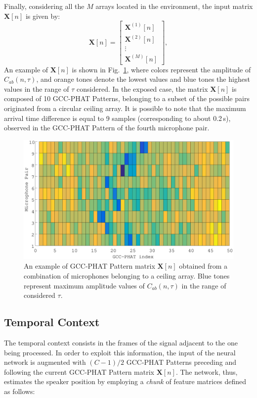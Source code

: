 \documentclass[review]{elsarticle}
\newcommand{\figref}[1]{Fig.~\ref{#1}}
\begin{document}
Finally, considering all the $M$ arrays located in the environment, the input matrix $\mathbf{X}[n]$ is given by:
\begin{equation}\label{eq:fx_matrix}
\mathbf{X}[n] =   \begin{bmatrix} \mathbf{X}^{(1)}[n] \\ \mathbf{X}^{(2)}[n] \\ \vdots\\ \mathbf{X}^{(M)}[n] \end{bmatrix},
\end{equation}
An example of $\mathbf{X}[n]$ is shown in \figref{fig:GCC-PATT}, where colors represent the amplitude of $C_{ab}(n,\tau)$, and orange tones denote the lowest values and blue tones the highest values in the range of $\tau$ considered. In the exposed case, the matrix $\mathbf{X}[n]$ is composed of 10 GCC-PHAT Patterns, belonging to a subset of the possible pairs originated from a circular ceiling array. It is possible to note that the maximum arrival time difference is equal to 9 samples (corresponding to about 0.2\,s), observed in the GCC-PHAT Pattern of the fourth microphone pair.


\begin{figure}[h]
	\centering
	\includegraphics[width=0.9\columnwidth]{imgs/GCC-PHAT-PATTERN}
	\caption{An example of GCC-PHAT Pattern matrix $\mathbf{X}[n]$ obtained from a combination of microphones belonging to a ceiling array. Blue tones represent maximum amplitude values of $C_{ab}(n,\tau)$ in the range of considered $\tau$.}
	\label{fig:GCC-PATT}
\end{figure}

\subsection{Temporal Context}\label{sec:TEE}
The temporal context consists in the frames of the signal adjacent to the one being processed. In order to exploit this information, the input of the neural network  is augmented with $(C-1)/2$ GCC-PHAT Patterns preceding and following the current GCC-PHAT Pattern matrix $\mathbf{X}[n]$. The network, thus, estimates the speaker position by employing a \textit{chunk} of feature matrices defined as follows:
\end{document}
